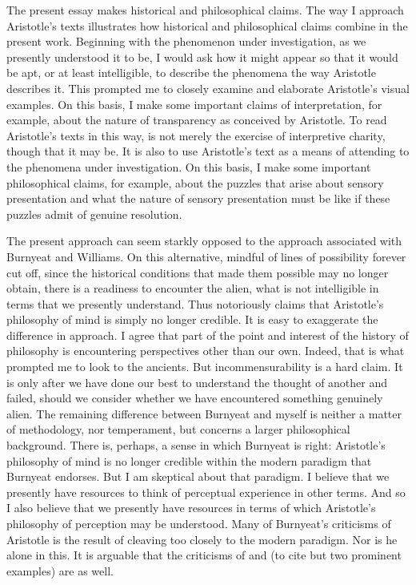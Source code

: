 The present essay makes historical and philosophical claims. The way I approach Aristotle's texts illustrates how historical and philosophical claims combine in the present work. Beginning with the phenomenon under investigation, as we presently understood it to be, I would ask how it might appear so that it would be apt, or at least intelligible, to describe the phenomena the way Aristotle describes it. This prompted me to closely examine and elaborate Aristotle's visual examples. On this basis, I make some important claims of interpretation, for example, about the nature of transparency as conceived by Aristotle. To read Aristotle's texts in this way, is not merely the exercise of interpretive charity, though that it may be. It is also to use Aristotle's text as a means of attending to the phenomena under investigation. On this basis, I make some important philosophical claims, for example, about the puzzles that arise about sensory presentation and what the nature of sensory presentation must be like if these puzzles admit of genuine resolution.

The present approach can seem starkly opposed to the approach associated with Burnyeat and Williams. On this alternative, mindful of lines of possibility forever cut off, since the historical conditions that made them possible may no longer obtain, there is a readiness to encounter the alien, what is not intelligible in terms that we presently understand. Thus \citet{Burnyeat:1992fk} notoriously claims that Aristotle's philosophy of mind is simply no longer credible. It is easy to exaggerate the difference in approach. I agree that part of the point and interest of the history of philosophy is encountering perspectives other than our own. Indeed, that is what prompted me to look to the ancients. But incommensurability is a hard claim. It is only after we have done our best to understand the thought of another and failed, should we consider whether we have encountered something genuinely alien. The remaining difference between Burnyeat and myself is neither a matter of methodology, nor temperament, but concerns a larger philosophical background. There is, perhaps, a sense in which Burnyeat is right: Aristotle's philosophy of mind is no longer credible within the modern paradigm that Burnyeat endorses. But I am skeptical about that paradigm. I believe that we presently have resources to think of perceptual experience in other terms. And so I also believe that we presently have resources in terms of which Aristotle's philosophy of perception may be understood. Many of Burnyeat's criticisms of Aristotle is the result of cleaving too closely to the modern paradigm. Nor is he alone in this. It is arguable that the criticisms of \citet{Broadie:1993fk} and \citet{Sorabji:1971fr} (to cite but two prominent examples) are as well.

